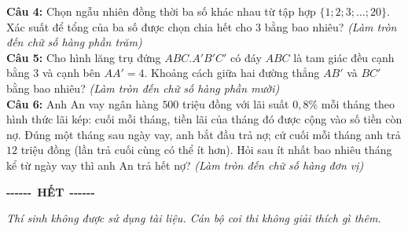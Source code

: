 \documentclass[12pt,a4paper]{article}
\begin{document}
\noindent \textbf{Câu 4:} Chọn ngẫu nhiên đồng thời ba số khác nhau từ tập hợp $\{1;2;3;\ldots;20\}$. Xác suất để tổng của ba số được chọn chia hết cho $3$ bằng bao nhiêu? \textit{(Làm tròn đến chữ số hàng phần trăm)}\\

\noindent \textbf{Câu 5:} Cho hình lăng trụ đứng $ABC.A'B'C'$ có đáy $ABC$ là tam giác đều cạnh bằng $3$ và cạnh bên $AA'=4$. Khoảng cách giữa hai đường thẳng $AB'$ và $BC'$ bằng bao nhiêu? \textit{(Làm tròn đến chữ số hàng phần mười)}\\

\noindent \textbf{Câu 6:} Anh An vay ngân hàng $500$ triệu đồng với lãi suất $0{,}8\%$ mỗi tháng theo hình thức lãi kép: cuối mỗi tháng, tiền lãi của tháng đó được cộng vào số tiền còn nợ. Đúng một tháng sau ngày vay, anh bắt đầu trả nợ; cứ cuối mỗi tháng anh trả $12$ triệu đồng (lần trả cuối cùng có thể ít hơn). Hỏi sau ít nhất bao nhiêu tháng kể từ ngày vay thì anh An trả hết nợ? \textit{(Làm tròn đến chữ số hàng đơn vị)}\\\vspace{0.6cm}
\begin{center}
{\bfseries -{}-{}-{}-{}-{}-}\ \textbf{HẾT}\ {\bfseries -{}-{}-{}-{}-{}-}
\end{center}
\vspace{0.15cm}
{\small\itshape
Thí sinh không được sử dụng tài liệu. Cán bộ coi thi không giải thích gì thêm.}
\end{document}
